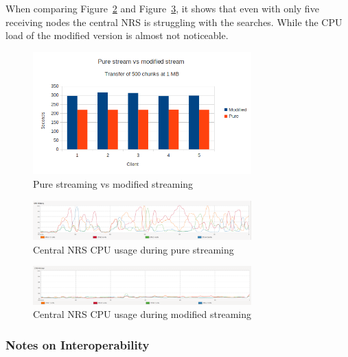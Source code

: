 When comparing Figure~\ref{fig:eval-stream-pure-cpu} and Figure~\ref{fig:eval-stream-mod-cpu}, it shows that even with only five receiving nodes the central NRS is struggling with the searches. While the CPU load of the modified version is almost not noticeable.  

\begin{figure}[h!]
	\centering
		\includegraphics[width=0.75\textwidth]{./img/eval-stream-plot-modvspure.png}
    	\caption{Pure streaming vs modified streaming}
	\label{fig:eval-stream-modvspure}
\end{figure}

\begin{figure}[h!]
	\centering
		\includegraphics[width=0.75\textwidth]{./img/eval-stream-pure-cpu.png}
    	\caption{Central NRS CPU usage during pure streaming}
	\label{fig:eval-stream-pure-cpu}
\end{figure}

\begin{figure}[h!]
	\centering
		\includegraphics[width=0.75\textwidth]{./img/eval-stream-mod-cpu.png}
    	\caption{Central NRS CPU usage during modified streaming}
	\label{fig:eval-stream-mod-cpu}
\end{figure}



\subsubsection{Notes on Interoperability}

